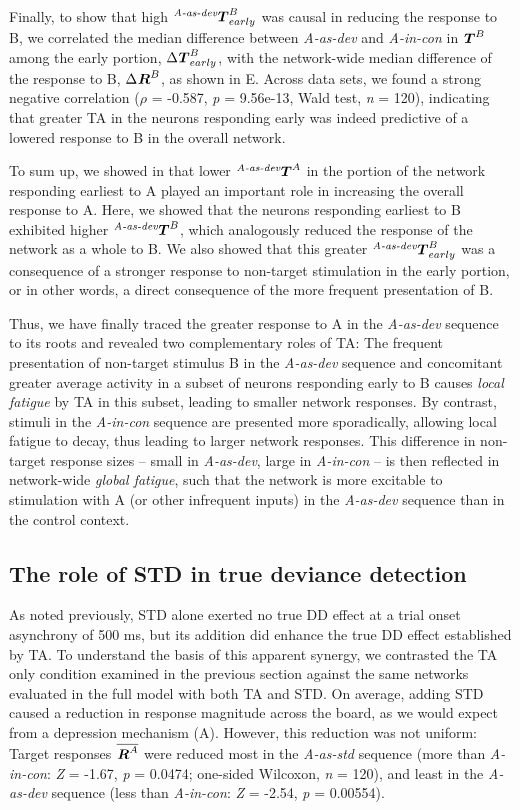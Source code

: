 \documentclass[9pt,lineno,onehalfspacing]{elife}
\newcommand{\dev}{\textit{A-as-dev}}
\newcommand{\msc}{\textit{A-in-con}}
\newcommand{\std}{\textit{A-as-std}}
\newcommand{\ifstringequal}[4]{%
  \ifnum\pdfstrcmp{#1}{#2}=0
  #3%
  \else
  #4%
  \fi
}
\newcommand{\seqreplace}[1]{\ifstringequal{dev}{#1}{\dev}{%
    \ifstringequal{std}{#1}{\std}{%
        \ifstringequal{msc}{#1}{\msc}{#1}%
    }%
}}
\newcommand{\R}[3][]{{}^{\seqreplace{#1}}_{}\boldsymbol R^{#2}_{#3}}
\newcommand{\T}[3][]{{}^{\seqreplace{#1}}_{}\boldsymbol T^{#2}_{#3}}
\newcommand{\mean}[1]{\overline{#1}}
\begin{document}
Finally, to show that high $\T[dev]{B}{early}$ was causal in reducing the response to B, we correlated the median difference between \dev{} and \msc{} in $\T{B}{}$ among the early portion, $\Delta \T{B}{early}$, with the network-wide median difference of the response to B, $\Delta \R{B}{}$, as shown in E. Across data sets, we found a strong negative correlation ($\rho$ = -0.587, \textit{p} = 9.56e-13, Wald test, \textit{n} = 120), indicating that greater TA in the neurons responding early was indeed predictive of a lowered response to B in the overall network.

To sum up, we showed in  that lower $\T[dev]{A}{}$ in the portion of the network responding earliest to A played an important role in increasing the overall response to A. Here, we showed that the neurons responding earliest to B exhibited higher $\T[dev]{B}{}$, which analogously reduced the response of the network as a whole to B. We also showed that this greater $\T[dev]{B}{early}$ was a consequence of a stronger response to non-target stimulation in the early portion, or in other words, a direct consequence of the more frequent presentation of B.

Thus, we have finally traced the greater response to A in the \dev{} sequence to its roots and revealed two complementary roles of TA: The frequent presentation of non-target stimulus B in the \dev{} sequence and concomitant greater average activity in a subset of neurons responding early to B causes \emph{local fatigue} by TA in this subset, leading to smaller network responses. By contrast, stimuli in the \msc{} sequence are presented more sporadically, allowing local fatigue to decay, thus leading to larger network responses. This difference in non-target response sizes -- small in \dev{}, large in \msc{} -- is then reflected in network-wide \emph{global fatigue}, such that the network is more excitable to stimulation with A (or other infrequent inputs) in the \dev{} sequence than in the control context.

\subsection{The role of STD in true deviance detection}\label{sec:std}

As noted previously, STD alone exerted no true DD effect at a trial onset asynchrony of 500 ms, but its addition did enhance the true DD effect established by TA. To understand the basis of this apparent synergy, we contrasted the TA only condition examined in the previous section against the same networks evaluated in the full model with both TA and STD. On average, adding STD caused a reduction in response magnitude across the board, as we would expect from a depression mechanism (A). However, this reduction was not uniform: Target responses $\mean{\R{A}{}}$ were reduced most in the \std{} sequence (more than \msc{}: \textit{Z} = -1.67, \textit{p} = 0.0474; one-sided Wilcoxon, \textit{n} = 120), and least in the \dev{} sequence (less than \msc{}: \textit{Z} = -2.54, \textit{p} = 0.00554).
\end{document}
